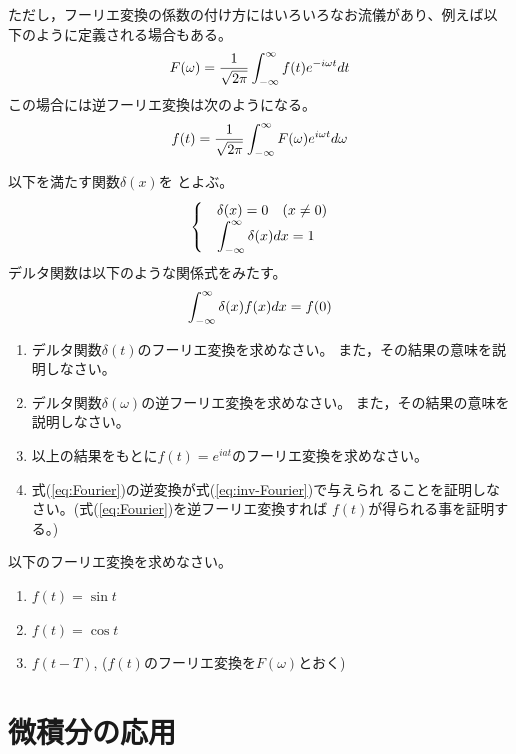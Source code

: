 \documentclass[twocolumn,11pt]{jarticle}
\begin{document}
ただし，フーリエ変換の係数の付け方にはいろいろなお流儀があり、例えば以
下のように定義される場合もある。
\begin{align}
  F(\omega)=\frac{1}{\sqrt{2\pi}}\int_{-\infty}^{\infty}f(t)e^{-i\omega t}dt
  \notag
\end{align}
この場合には逆フーリエ変換は次のようになる。
\begin{align}
  f(t)=\frac{1}{\sqrt{2\pi}}\int_{-\infty}^{\infty}F(\omega)e^{i\omega t}d\omega
  \notag
\end{align}

\nquestion
以下を満たす関数$\delta(x)$を
とよぶ。
\begin{align}
  \begin{cases}
  &\delta(x)=0\quad  (x\ne 0)\notag\\
  &\displaystyle\int_{-\infty}^{\infty}\delta(x)dx=1
  \end{cases}
\end{align}
デルタ関数は以下のような関係式をみたす。
\begin{align}
  \int_{-\infty}^{\infty}\delta(x)f(x)dx=f(0)\notag
\end{align}
\begin{enumerate}
\item デルタ関数$\delta(t)$のフーリエ変換を求めなさい。
  また，その結果の意味を説明しなさい。
\item デルタ関数$\delta(\omega)$の逆フーリエ変換を求めなさい。
  また，その結果の意味を説明しなさい。
\item 以上の結果をもとに$f(t)=e^{iat}$のフーリエ変換を求めなさい。
\item 式(\ref{eq:Fourier})の逆変換が式(\ref{eq:inv-Fourier})で与えられ
  ることを証明しなさい。(式(\ref{eq:Fourier})を逆フーリエ変換すれば
  $f(t)$が得られる事を証明する。)
\end{enumerate}

\nquestion
以下のフーリエ変換を求めなさい。
\begin{enumerate}
\item $f(t)=\sin t$
\item $f(t)=\cos t$
\item $f(t-T)$, \quad($f(t)$のフーリエ変換を$F(\omega)$とおく)
\end{enumerate}

\newpage

\section{微積分の応用}
\end{document}
